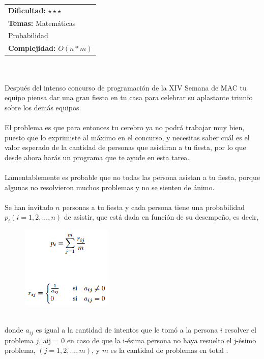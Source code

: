 \documentclass[12pt]{article}
\begin{document}
{{{\hfill
\begin{tabular}{@{}l@{}}
\textbf{Dificultad:} $\star\star\star$ \\
\textbf{Temas:} Matemáticas \\
Probabilidad \\
\textbf{Complejidad:} $O(n*m)$
\end{tabular}\\
\\
Después del intenso concurso de programación de la XIV Semana de MAC tu equipo piensa dar una gran fiesta en tu casa para celebrar su aplastante triunfo sobre los demás equipos.\\
\\El problema es que para entonces tu cerebro ya no podrá trabajar muy bien, puesto que lo exprimiste al máximo en el concurso, y necesitas saber cuál es el valor esperado de la cantidad de personas que asistiran a tu fiesta, por lo que desde ahora harás un programa que te ayude en esta tarea.\\
\\Lamentablemente es probable que no todas las persona asistan a tu fiesta, porque algunas no resolvieron muchos problemas y no se sienten de ánimo.\\
\\Se han invitado $n$ personas a tu fiesta y cada persona tiene una probabilidad $p_i (i = 1, 2, . . . , n)$ de asistir, que está dada en función de su desempeño, es decir,
\begin{figure}[h!] 
\begin{center} 
\includegraphics[scale = 1]{form.PNG}\hspace{50mm}  
\end{center} 
\end{figure}
\\donde $a_{ij}$ es igual a la cantidad de intentos que le tomó a la persona $i$ resolver el problema $j$, aij = 0 en caso de
que la i-ésima persona no haya resuelto el j-ésimo problema, $(j = 1, 2, . . . , m)$, y $m$ es la cantidad de problemas en
total .\\
\\
}}}
\end{document}

